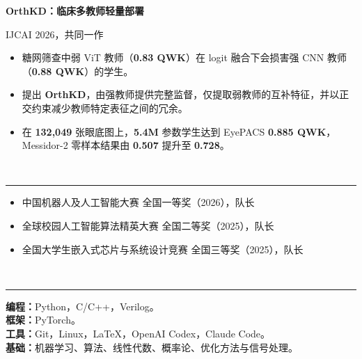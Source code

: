 \documentclass[10pt]{article}
\newcommand{\cvsection}[1]{%
  \par\vspace{1pt}%
  \noindent{\large\bfseries #1}\\[-4.5pt]%
  \noindent\rule{\textwidth}{0.4pt}\par\vspace{0pt}%
}
\newcommand{\researchblock}[3]{%
  \textbf{#1}\par
  #2\par
  \begin{itemize}#3\end{itemize}%
}
\begin{document}
\researchblock{OrthKD：临床多教师轻量部署}{IJCAI 2026，共同一作}{
  \item 糖网筛查中弱 ViT 教师（\textbf{0.83 QWK}）在 logit 融合下会损害强 CNN 教师（\textbf{0.88 QWK}）的学生。
  \item 提出 \textbf{OrthKD}，由强教师提供完整监督，仅提取弱教师的互补特征，并以正交约束减少教师特定表征之间的冗余。
  \item 在 \textbf{132{,}049} 张眼底图上，\textbf{5.4M} 参数学生达到 EyePACS \textbf{0.885 QWK}，Messidor-2 零样本结果由 \textbf{0.507} 提升至 \textbf{0.728}。
}
\cvsection{获奖情况}
\begin{itemize}
  \item 中国机器人及人工智能大赛 全国一等奖（2026），队长
  \item 全球校园人工智能算法精英大赛 全国二等奖（2025），队长
  \item 全国大学生嵌入式芯片与系统设计竞赛 全国三等奖（2025），队长
\end{itemize}
\cvsection{专业能力}
\textbf{编程：}Python，C/C++，Verilog。\\
\textbf{框架：}PyTorch。\\
\textbf{工具：}Git，Linux，LaTeX，OpenAI Codex，Claude Code。\\
\textbf{基础：}机器学习、算法、线性代数、概率论、优化方法与信号处理。
\end{document}
